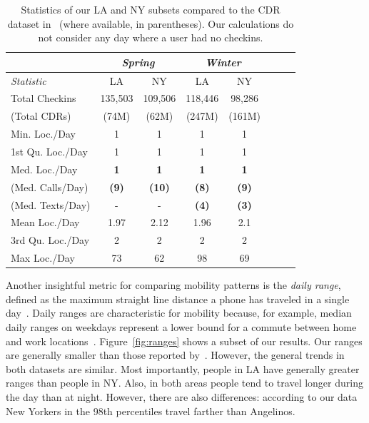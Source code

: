 \begin{table}[t]
\centering
{\small
\begin{tabular}{| l | c | c | c | c | c | c | c |}
\hline
 & \multicolumn{2}{c|}{\textit{Spring}}& \multicolumn{2}{c|}{\textit{Winter}}  \\ \hline
\textit{Statistic} & LA          & NY           & LA          & NY \\ \hline
Total Checkins     & 135,503     & 109,506      & 118,446     & 98,286  \\
(Total CDRs)       & (74M)       & (62M)        & (247M)      & (161M) \\ \hline
Min. Loc./Day      & 1           & 1            & 1           & 1 \\ \hline
1st Qu. Loc./Day   & 1           & 1            & 1           & 1 \\ \hline
Med. Loc./Day      & \textbf{1}  & \textbf{1}   & \textbf{1}  & \textbf{1} \\
(Med. Calls/Day)   & \textbf{(9)}& \textbf{(10)}& \textbf{(8)}& \textbf{(9)} \\ 
(Med. Texts/Day)   & -           &  -           & \textbf{(4)}& \textbf{(3)} \\ \hline
Mean Loc./Day      & 1.97        & 2.12         & 1.96        & 2.1 \\ \hline
3rd Qu. Loc./Day   & 2           & 2            & 2           & 2 \\ \hline
Max Loc./Day       & 73          & 62           & 98          & 69 \\ \hline		
\end{tabular}
}
\caption{Statistics of our LA and NY subsets compared to the CDR dataset in~\protect\cite{Isaacman:2011cn} (where available, in parentheses). Our calculations do not consider any day where a user had no checkins.}
\label{tab:basics}
\end{table}

Another insightful metric for comparing mobility patterns is the \emph{daily range}, defined as the maximum straight line distance a phone has traveled in a single day~\cite{Isaacman:2010en}. Daily ranges are characteristic for mobility because, for example, median daily ranges on weekdays represent a lower bound for a commute between home and work locations~\cite{Isaacman:2010en}. Figure~\ref{fig:ranges} shows a subset of our results. Our ranges are generally smaller than those reported by~\cite{Isaacman:2011cn,Isaacman:2010en}. However, the general trends in both datasets are similar. Most importantly, people in LA have generally greater ranges than people in NY. Also, in both areas people tend to travel longer during the day than at night. However, there are also differences: according to our data New Yorkers in the 98th percentiles travel farther than Angelinos.


